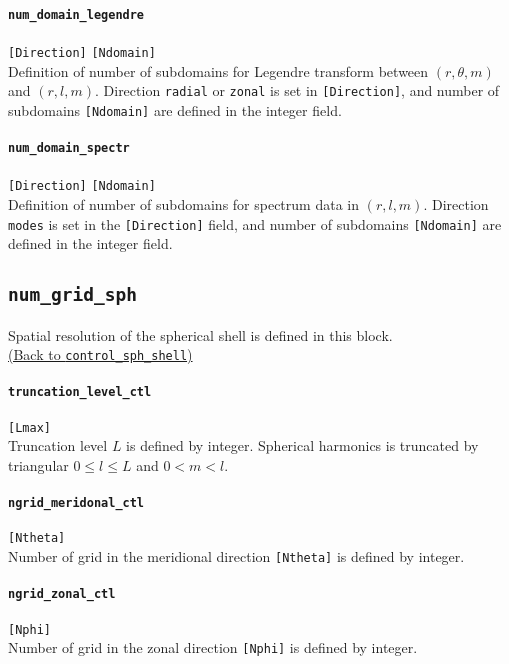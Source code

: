 \paragraph{\tt num\_domain\_legendre}
\label{href_t:num_domain_legendre}
\verb|[Direction]| \verb|[Ndomain]| \\
 Definition of number of subdomains for Legendre transform between $(r, \theta, m)$ and $(r, l, m)$. Direction {\tt  radial} or {\tt zonal} is set in \verb|[Direction]|, and number of subdomains \verb|[Ndomain]| are defined in the integer field.

\paragraph{\tt num\_domain\_spectr}
\label{href_t:num_domain_spectr}
\verb|[Direction]| \verb|[Ndomain]| \\
Definition of number of subdomains for spectrum data in $(r, l, m)$. Direction {\tt  modes} is set in the \verb|[Direction]| field, and number of subdomains \verb|[Ndomain]| are defined in the integer field.


\subsection{\tt num\_grid\_sph}
\label{href_t:num_grid_sph}
Spatial resolution of the spherical shell is defined in this block. \\
\hyperref[href_i:num_grid_sph]{(Back to {\tt control\_sph\_shell})}

\paragraph{\tt truncation\_level\_ctl}
\label{href_t:truncation_level_ctl}
\verb|[Lmax]| \\
Truncation level $L$ is defined by integer. Spherical harmonics is truncated by triangular $0 \le l \le L$ and $0 <m < l$.

\paragraph{\tt ngrid\_meridonal\_ctl}
\label{href_t:ngrid_meridonal_ctl}
\verb|[Ntheta]| \\
Number of grid in the meridional direction \verb|[Ntheta]| is defined by integer.

\paragraph{\tt ngrid\_zonal\_ctl}
\label{href_t:ngrid_zonal_ctl}
\verb|[Nphi]| \\
Number of grid in the zonal direction \verb|[Nphi]| is defined by integer.

